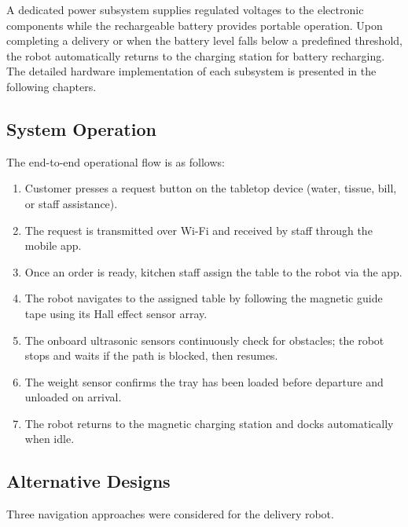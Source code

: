 \documentclass[12pt,a4paper]{article}
\begin{document}
A dedicated power subsystem supplies regulated voltages to the
electronic components while the rechargeable battery provides portable
operation. Upon completing a delivery or when the battery level falls
below a predefined threshold, the robot automatically returns to the
charging station for battery recharging. The detailed hardware
implementation of each subsystem is presented in the following
chapters.

\subsection{System Operation}
The end-to-end operational flow is as follows:
\begin{enumerate}[nosep]
  \item Customer presses a request button on the tabletop device
  (water, tissue, bill, or staff assistance).
  \item The request is transmitted over Wi-Fi and received by staff
  through the mobile app.
  \item Once an order is ready, kitchen staff assign the table to the
  robot via the app.
  \item The robot navigates to the assigned table by following the
  magnetic guide tape using its Hall effect sensor array.
  \item The onboard ultrasonic sensors continuously check for
  obstacles; the robot stops and waits if the path is blocked, then
  resumes.
  \item The weight sensor confirms the tray has been loaded before
  departure and unloaded on arrival.
  \item The robot returns to the magnetic charging station and docks
  automatically when idle.
\end{enumerate}

\subsection{Alternative Designs}

Three navigation approaches were considered for the delivery robot.
\end{document}
